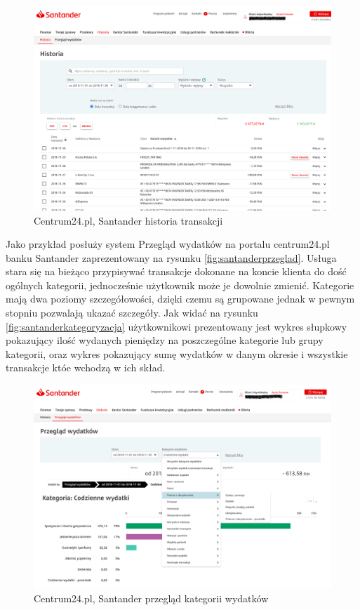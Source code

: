 \documentclass[a4paper,10pt, twoside]{report}
\begin{document}
\begin{large}
\begin{figure}[H]           %
    \centering
    \includegraphics[width=12cm]{figures/Santander_PrzegladWydatkow_historia.png}
    \caption{Centrum24.pl, Santander historia transakcji}
    \label{fig:santanderhistoria}
\end{figure}

{Jako przykład posłuży system Przegląd wydatków na portalu centrum24.pl banku 
Santander zaprezentowany na rysunku \ref{fig:santanderprzeglad}. Usługa stara się 
na bieżąco przypisywać transakcje dokonane na koncie klienta do dość ogólnych 
kategorii, jednocześnie użytkownik może je dowolnie zmienić. Kategorie mają dwa 
poziomy szczegółowości, dzięki czemu są grupowane jednak w pewnym stopniu 
pozwalają ukazać szczegóły. Jak widać na rysunku \ref{fig:santanderkategoryzacja} 
użytkownikowi prezentowany jest wykres słupkowy pokazujący ilość wydanych 
pieniędzy na poszczególne kategorie lub grupy kategorii, oraz wykres pokazujący 
sumę wydatków w danym okresie i wszystkie transakcje któe wchodzą w ich skład.}

\begin{figure}[H]           %
    \centering
    \includegraphics[width=12cm]{figures/Santander_PrzegladWydatkow_przeglad_kategoria.png}
    \caption{Centrum24.pl, Santander przegląd kategorii wydatków}
    \label{fig:santanderprzegladkategoria}


\end{figure}
\end{large}
\end{document}
